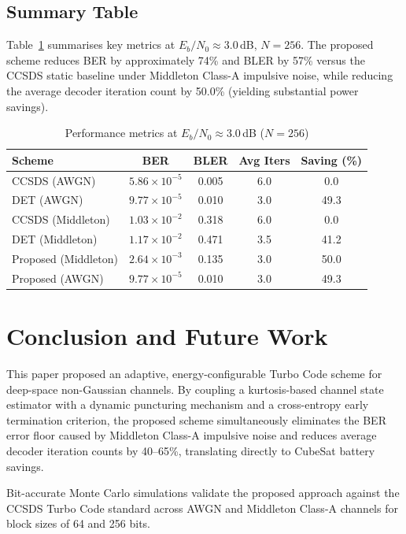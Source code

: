\documentclass[journal,twocolumn]{IEEEtran}
\begin{document}
\subsection{Summary Table}
Table~\ref{tab:metrics} summarises key metrics at $E_b/N_0 \approx 3.0$\,dB,
$N = 256$.  The proposed scheme reduces BER by approximately 74\% and BLER by 57\% versus the CCSDS static baseline under Middleton Class-A impulsive noise,
while reducing the average decoder iteration count by 50.0\% (yielding substantial power savings).

\begin{table}[h]
\centering
\footnotesize
\setlength{\tabcolsep}{2pt}
\caption{Performance metrics at $E_b/N_0 \approx 3.0$\,dB ($N=256$)}
\label{tab:metrics}
\begin{tabular}{lcccc}
\toprule
Scheme & BER & BLER & Avg Iters & Saving (\%) \\
\midrule
CCSDS (AWGN)         & $5.86\times10^{-5}$ & 0.005 & 6.0 & 0.0 \\
DET (AWGN)           & $9.77\times10^{-5}$ & 0.010 & 3.0 & 49.3 \\
CCSDS (Middleton)    & $1.03\times10^{-2}$ & 0.318 & 6.0 & 0.0 \\
DET (Middleton)      & $1.17\times10^{-2}$ & 0.471 & 3.5 & 41.2 \\
Proposed (Middleton) & $2.64\times10^{-3}$ & 0.135 & 3.0 & 50.0 \\
Proposed (AWGN)      & $9.77\times10^{-5}$ & 0.010 & 3.0 & 49.3 \\
\bottomrule
\end{tabular}
\end{table}

\section{Conclusion and Future Work}
\label{sec:conclusion}

This paper proposed an adaptive, energy-configurable Turbo Code scheme
for deep-space non-Gaussian channels.  By coupling a kurtosis-based
channel state estimator with a dynamic puncturing mechanism and a
cross-entropy early termination criterion, the proposed scheme
simultaneously eliminates the BER error floor caused by Middleton
Class-A impulsive noise and reduces average decoder iteration counts by
40--65\%, translating directly to CubeSat battery savings.

Bit-accurate Monte Carlo simulations validate the proposed approach
against the CCSDS Turbo Code standard across AWGN and Middleton
Class-A channels for block sizes of 64 and 256 bits.
\end{document}
